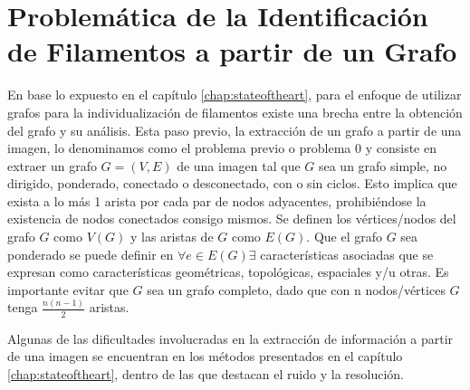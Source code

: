 \chapter{Problem\'atica de la Identificaci\'on de Filamentos a partir de un Grafo}
\label{chap:cap2}


En base lo expuesto en el cap\'itulo \ref{chap:stateoftheart}, para el enfoque de utilizar grafos para la individualizaci\'on de filamentos existe una brecha entre la obtenci\'on del grafo y su an\'alisis. Esta paso previo, la extracci\'on de un grafo a partir de una imagen, lo denominamos como el problema previo o problema 0 y consiste en extraer un grafo $G = (V,E)$ de una imagen tal que $G$ sea un grafo simple, no dirigido, ponderado, conectado o desconectado, con o sin ciclos. Esto implica que exista a lo m\'as 1 arista por cada par de nodos adyacentes, prohibi\'endose la existencia de nodos conectados consigo mismos. Se definen los v\'ertices/nodos del grafo $G$ como $V(G)$ y las aristas de $G$ como $E(G)$. 
Que el grafo $G$ sea ponderado se puede definir en $\forall e \in E(G)  \exists $ caracter\'isticas asociadas que se expresan como caracter\'isticas geom\'etricas, topol\'ogicas, espaciales y/u otras. Es importante evitar que $G$ sea un grafo completo, dado que con n nodos/v\'ertices $G$ tenga $\frac{n(n-1)}{2}$ aristas. 

Algunas de las dificultades involucradas en la extracci\'on de informaci\'on a partir de una imagen se encuentran en los m\'etodos presentados en el cap\'itulo \ref{chap:stateoftheart}, dentro de las que destacan el ruido y la resoluci\'on.

